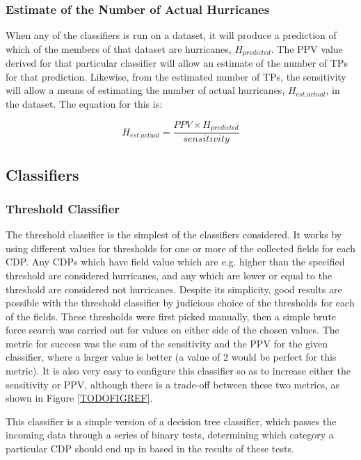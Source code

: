 \documentclass[pdftex,12pt,a4paper]{report}
\begin{document}
\subsubsection{Estimate of the Number of Actual Hurricanes}

When any of the classifiers is run on a dataset, it will produce a prediction of which of the
members of that dataset are hurricanes, $H_{predicted}$. The PPV value derived for that particular classifier will
allow an estimate of the number of TPs for that prediction. Likewise, from the estimated number of
TPs, the sensitivity will allow a means of estimating the number of actual hurricanes, $H_{est. actual}$,
in the dataset. The equation for this is:

\begin{equation}
    H_{est. actual} = \frac{PPV \times H_{predicted}}{sensitivity}
    \label{eqn:n_actual_hurricane}
\end{equation}

\subsection{Classifiers}

\subsubsection{Threshold Classifier}
The threshold classifier is the simplest of the classifiers considered. It works by using different
values for thresholds for one or more of the collected fields for each CDP. Any CDPs which have
field value which are e.g. higher than the specified threshold are considered hurricanes, and any
which are lower or equal to the threshold are considered not hurricanes. Despite its simplicity,
good results are possible with the threshold classifier by judicious choice of the thresholds for
each of the fields. These thresholds were first picked manually, then a simple brute force search
was carried out for values on either side of the chosen values. The metric for success was the sum
of the sensitivity and the PPV for the given classifier, where a larger value is better (a value of
2 would be perfect for this metric). It is also very easy to configure this classifier so as to
increase either the sensitivity or PPV, although there is a trade-off between these two metrics, as
shown in Figure \ref{TODOFIGREF}.

This classifier is a simple version of a decision tree classifier, which passes the incoming data
through a series of binary tests, determining which category a particular CDP should end up in based
in the results of these tests.
\end{document}
